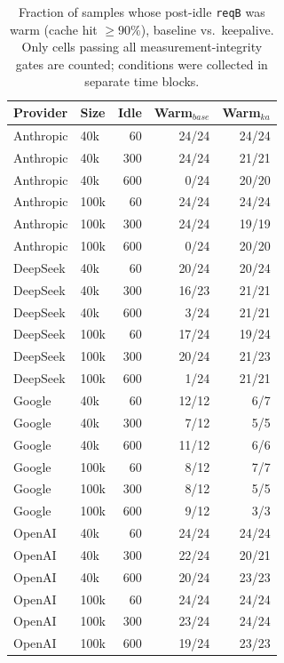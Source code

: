 \begin{table}[t]
\centering\footnotesize
\caption{Fraction of samples whose post-idle \texttt{reqB} was warm (cache hit $\geq 90\%$), baseline vs.\ keepalive. Only cells passing all measurement-integrity gates are counted; conditions were collected in separate time blocks.}
\label{tab:summary}
\begin{tabular}{llrrr}
\toprule
Provider & Size & Idle & Warm$_{base}$ & Warm$_{ka}$ \\
\midrule
Anthropic & 40k & 60 & 24/24 & 24/24 \\
Anthropic & 40k & 300 & 24/24 & 21/21 \\
Anthropic & 40k & 600 & 0/24 & 20/20 \\
Anthropic & 100k & 60 & 24/24 & 24/24 \\
Anthropic & 100k & 300 & 24/24 & 19/19 \\
Anthropic & 100k & 600 & 0/24 & 20/20 \\
DeepSeek & 40k & 60 & 20/24 & 20/24 \\
DeepSeek & 40k & 300 & 16/23 & 21/21 \\
DeepSeek & 40k & 600 & 3/24 & 21/21 \\
DeepSeek & 100k & 60 & 17/24 & 19/24 \\
DeepSeek & 100k & 300 & 20/24 & 21/23 \\
DeepSeek & 100k & 600 & 1/24 & 21/21 \\
Google & 40k & 60 & 12/12 & 6/7 \\
Google & 40k & 300 & 7/12 & 5/5 \\
Google & 40k & 600 & 11/12 & 6/6 \\
Google & 100k & 60 & 8/12 & 7/7 \\
Google & 100k & 300 & 8/12 & 5/5 \\
Google & 100k & 600 & 9/12 & 3/3 \\
OpenAI & 40k & 60 & 24/24 & 24/24 \\
OpenAI & 40k & 300 & 22/24 & 20/21 \\
OpenAI & 40k & 600 & 20/24 & 23/23 \\
OpenAI & 100k & 60 & 24/24 & 24/24 \\
OpenAI & 100k & 300 & 23/24 & 24/24 \\
OpenAI & 100k & 600 & 19/24 & 23/23 \\
\bottomrule
\end{tabular}
\end{table}
